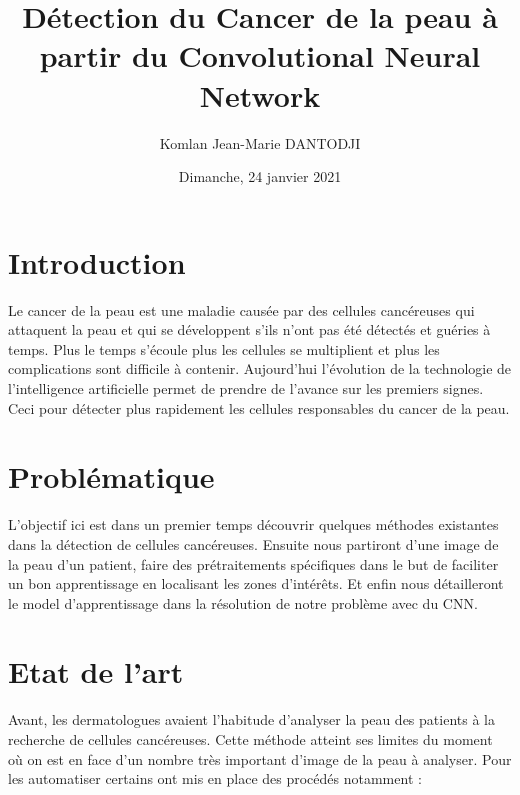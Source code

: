 \documentclass[12pt, letterpaper]{article}
\title{Détection du Cancer de la peau à partir du Convolutional Neural Network}
\author{Komlan Jean-Marie DANTODJI
\\
    \multicolumn{1}{
        p{.7\textwidth}}{\centering\emph{Université Paris Vincennes St-Denis\\
  M1 Big Data\\}
  }
}
\date{Dimanche, 24 janvier 2021}
\begin{document}
\begin{titlepage}
    \maketitle
\end{titlepage}

\tableofcontents

\newpage
\section{Introduction}
\par Le cancer de la peau est une maladie causée par des cellules cancéreuses qui attaquent la peau et qui se développent s’ils n’ont pas été détectés et guéries à temps. Plus le temps s’écoule plus les cellules se multiplient et plus les complications sont difficile à contenir. Aujourd’hui l’évolution de la technologie de l’intelligence artificielle permet de prendre de l’avance sur les premiers signes. Ceci pour détecter plus rapidement les cellules responsables du cancer de la peau. \\
\section{Problématique}
\par L’objectif ici est dans un premier temps découvrir quelques méthodes existantes dans la détection de cellules cancéreuses. Ensuite nous partiront d’une image de la peau d’un patient, faire des prétraitements spécifiques dans le but de faciliter un bon apprentissage en localisant les zones d’intérêts. Et enfin nous détailleront le model d’apprentissage dans la résolution de notre problème avec du CNN. \\
\section{Etat de l'art}
\par Avant, les dermatologues avaient l’habitude d’analyser la peau des patients à la recherche de cellules cancéreuses. Cette méthode atteint ses limites du moment où on est en face d'un nombre très important d’image de la peau à analyser. Pour les automatiser certains ont mis en place des procédés notamment : \\
\end{document}
